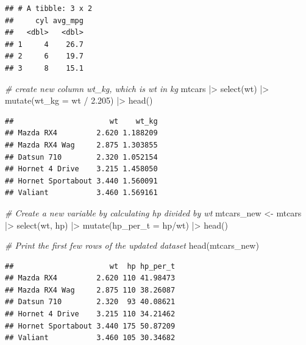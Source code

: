 \documentclass[
  12pt,
  oneside]{book}
\newenvironment{Shaded}{\begin{snugshade}}{\end{snugshade}}
\newcommand{\AttributeTok}[1]{\textcolor[rgb]{0.77,0.63,0.00}{#1}}
\newcommand{\CommentTok}[1]{\textcolor[rgb]{0.56,0.35,0.01}{\textit{#1}}}
\newcommand{\FloatTok}[1]{\textcolor[rgb]{0.00,0.00,0.81}{#1}}
\newcommand{\FunctionTok}[1]{\textcolor[rgb]{0.00,0.00,0.00}{#1}}
\newcommand{\NormalTok}[1]{#1}
\newcommand{\OtherTok}[1]{\textcolor[rgb]{0.56,0.35,0.01}{#1}}
\newcommand{\SpecialCharTok}[1]{\textcolor[rgb]{0.00,0.00,0.00}{#1}}
\theoremstyle{definition}
\theoremstyle{definition}
\theoremstyle{definition}
\theoremstyle{definition}
\theoremstyle{remark}
\begin{document}
\begin{verbatim}
## # A tibble: 3 x 2
##     cyl avg_mpg
##   <dbl>   <dbl>
## 1     4    26.7
## 2     6    19.7
## 3     8    15.1
\end{verbatim}

\begin{Shaded}
\begin{Highlighting}[]
\CommentTok{\# create new column wt\_kg, which is wt in kg}
\NormalTok{mtcars }\SpecialCharTok{|\textgreater{}} 
  \FunctionTok{select}\NormalTok{(wt) }\SpecialCharTok{|\textgreater{}} 
  \FunctionTok{mutate}\NormalTok{(}\AttributeTok{wt\_kg =}\NormalTok{ wt }\SpecialCharTok{/} \FloatTok{2.205}\NormalTok{) }\SpecialCharTok{|\textgreater{}} 
  \FunctionTok{head}\NormalTok{()}
\end{Highlighting}
\end{Shaded}

\begin{verbatim}
##                      wt    wt_kg
## Mazda RX4         2.620 1.188209
## Mazda RX4 Wag     2.875 1.303855
## Datsun 710        2.320 1.052154
## Hornet 4 Drive    3.215 1.458050
## Hornet Sportabout 3.440 1.560091
## Valiant           3.460 1.569161
\end{verbatim}

\begin{Shaded}
\begin{Highlighting}[]
\CommentTok{\# Create a new variable by calculating hp divided by wt}
\NormalTok{mtcars\_new }\OtherTok{\textless{}{-}}\NormalTok{ mtcars }\SpecialCharTok{|\textgreater{}} 
  \FunctionTok{select}\NormalTok{(wt, hp) }\SpecialCharTok{|\textgreater{}} 
  \FunctionTok{mutate}\NormalTok{(}\AttributeTok{hp\_per\_t =}\NormalTok{ hp}\SpecialCharTok{/}\NormalTok{wt) }\SpecialCharTok{|\textgreater{}} 
  \FunctionTok{head}\NormalTok{()}

\CommentTok{\# Print the first few rows of the updated dataset}
\FunctionTok{head}\NormalTok{(mtcars\_new)}
\end{Highlighting}
\end{Shaded}

\begin{verbatim}
##                      wt  hp hp_per_t
## Mazda RX4         2.620 110 41.98473
## Mazda RX4 Wag     2.875 110 38.26087
## Datsun 710        2.320  93 40.08621
## Hornet 4 Drive    3.215 110 34.21462
## Hornet Sportabout 3.440 175 50.87209
## Valiant           3.460 105 30.34682
\end{verbatim}
\end{document}

